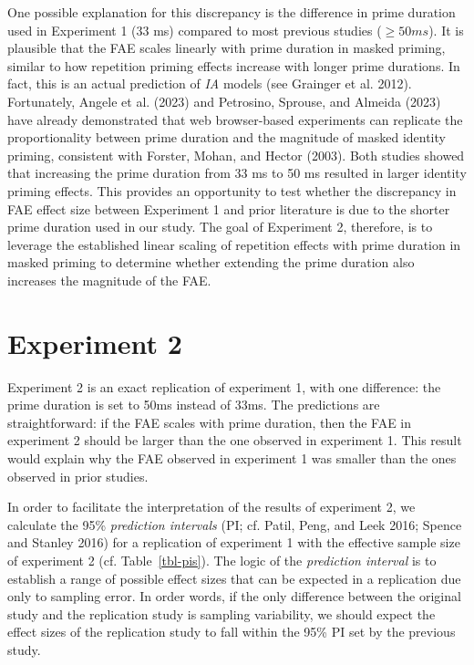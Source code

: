 \documentclass[
]{interact}
\begin{document}
One possible explanation for this discrepancy is the difference in prime
duration used in Experiment 1 (33 ms) compared to most previous studies
(\(\geq 50 ms\)). It is plausible that the FAE scales linearly with
prime duration in masked priming, similar to how repetition priming
effects increase with longer prime durations. In fact, this is an actual
prediction of \emph{IA} models (see Grainger et al. 2012). Fortunately,
Angele et al. (2023) and Petrosino, Sprouse, and Almeida (2023) have
already demonstrated that web browser-based experiments can replicate
the proportionality between prime duration and the magnitude of masked
identity priming, consistent with Forster, Mohan, and Hector (2003).
Both studies showed that increasing the prime duration from 33 ms to 50
ms resulted in larger identity priming effects. This provides an
opportunity to test whether the discrepancy in FAE effect size between
Experiment 1 and prior literature is due to the shorter prime duration
used in our study. The goal of Experiment 2, therefore, is to leverage
the established linear scaling of repetition effects with prime duration
in masked priming to determine whether extending the prime duration also
increases the magnitude of the FAE.

\section{Experiment 2}\label{sec-exp2}

Experiment 2 is an exact replication of experiment 1, with one
difference: the prime duration is set to 50ms instead of 33ms. The
predictions are straightforward: if the FAE scales with prime duration,
then the FAE in experiment 2 should be larger than the one observed in
experiment 1. This result would explain why the FAE observed in
experiment 1 was smaller than the ones observed in prior studies.

In order to facilitate the interpretation of the results of experiment
2, we calculate the 95\% \emph{prediction intervals} (PI; cf. Patil,
Peng, and Leek 2016; Spence and Stanley 2016) for a replication of
experiment 1 with the effective sample size of experiment 2 (cf.
Table~\ref{tbl-pis}). The logic of the \emph{prediction interval} is to
establish a range of possible effect sizes that can be expected in a
replication due only to sampling error. In order words, if the only
difference between the original study and the replication study is
sampling variability, we should expect the effect sizes of the
replication study to fall within the 95\% PI set by the previous study.
\end{document}
